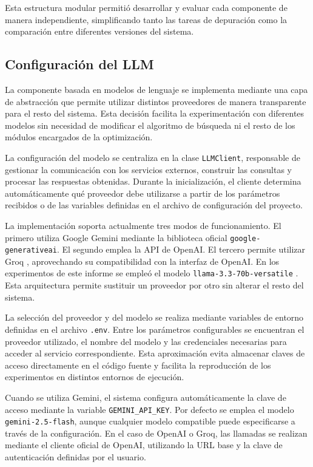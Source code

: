 \documentclass[12pt,a4paper]{article}
\begin{document}
Esta estructura modular permitió desarrollar y evaluar cada componente de manera independiente, simplificando tanto las tareas de depuración como la comparación entre diferentes versiones del sistema.

\subsection{Configuración del LLM}

La componente basada en modelos de lenguaje se implementa mediante una capa de abstracción que permite utilizar distintos proveedores de manera transparente para el resto del sistema. Esta decisión facilita la experimentación con diferentes modelos sin necesidad de modificar el algoritmo de búsqueda ni el resto de los módulos encargados de la optimización.

La configuración del modelo se centraliza en la clase \texttt{LLMClient}, responsable de gestionar la comunicación con los servicios externos, construir las consultas y procesar las respuestas obtenidas. Durante la inicialización, el cliente determina automáticamente qué proveedor debe utilizarse a partir de los parámetros recibidos o de las variables definidas en el archivo de configuración del proyecto.

La implementación soporta actualmente tres modos de funcionamiento. El primero utiliza Google Gemini mediante la biblioteca oficial \texttt{google-generativeai}. El segundo emplea la API de OpenAI. El tercero permite utilizar Groq \cite{groq2024}, aprovechando su compatibilidad con la interfaz de OpenAI. En los experimentos de este informe se empleó el modelo \texttt{llama-3.3-70b-versatile} \cite{meta2024llama33}. Esta arquitectura permite sustituir un proveedor por otro sin alterar el resto del sistema.

La selección del proveedor y del modelo se realiza mediante variables de entorno definidas en el archivo \texttt{.env}. Entre los parámetros configurables se encuentran el proveedor utilizado, el nombre del modelo y las credenciales necesarias para acceder al servicio correspondiente. Esta aproximación evita almacenar claves de acceso directamente en el código fuente y facilita la reproducción de los experimentos en distintos entornos de ejecución.

Cuando se utiliza Gemini, el sistema configura automáticamente la clave de acceso mediante la variable \texttt{GEMINI\_API\_KEY}. Por defecto se emplea el modelo \texttt{gemini-2.5-flash}, aunque cualquier modelo compatible puede especificarse a través de la configuración. En el caso de OpenAI o Groq, las llamadas se realizan mediante el cliente oficial de OpenAI, utilizando la URL base y la clave de autenticación definidas por el usuario.
\end{document}

